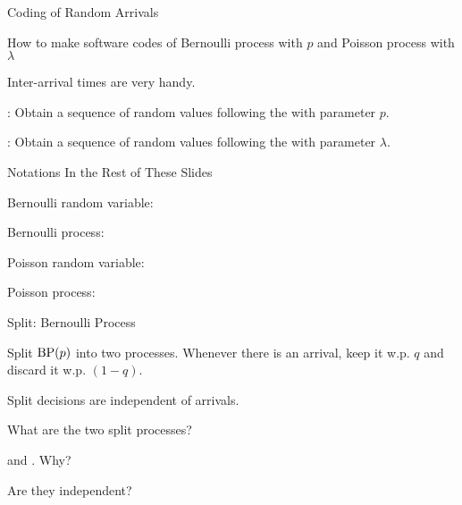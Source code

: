 \begin{frame}{Coding of Random Arrivals}

  \plitemsep 0.1in

  \bci
  
\item \question How to make software codes of Bernoulli process with $p$ and Poisson process with $\lambda$

\item Inter-arrival times are very handy. 
  
\item {}: Obtain a sequence of random values
  following the  with parameter $p.$

\item {}: Obtain a sequence of random values
  following the  with parameter $\lambda.$
  
  \eci

\end{frame}

\begin{frame}{Notations In the Rest of These Slides}

  \plitemsep 0.2in

  \bci
  
\item Bernoulli random variable: 

\item Bernoulli process: 

\item Poisson random variable: \bluef{$\poisson{\lambda}$}

\item Poisson process: \redf{$\pp{\lambda}$}

  \eci

\end{frame}


\begin{frame}{Split: Bernoulli Process}

\plitemsep 0.05in
\bci
\item Split $\text{BP}(p)$ into two processes. Whenever there is an arrival, keep it w.p. $q$ and
  discard it w.p. $(1-q).$

\item<2-> Split decisions are independent of arrivals.

\item<3-> \question What are the two split processes?


\item<4->  and . Why?

\item<5-> Are they independent?  
  \eci

\vspace{-0.7cm}

\end{frame}

